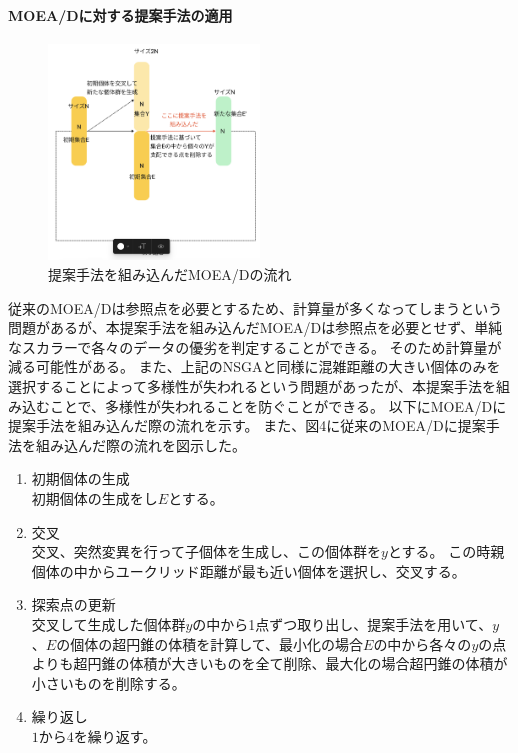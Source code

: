 \documentclass{rentai-chugoku}
\begin{document}
\paragraph{MOEA/Dに対する提案手法の適用}
\begin{figure}[h]
\begin{center}
\includegraphics[width=0.5\textwidth]{MOEAD2.png}
\end{center}
\label{MOEA/D}
\caption{提案手法を組み込んだMOEA/Dの流れ}
\end{figure}
従来のMOEA/Dは参照点を必要とするため、計算量が多くなってしまうという問題があるが、本提案手法を組み込んだMOEA/Dは参照点を必要とせず、単純なスカラーで各々のデータの優劣を判定することができる。
そのため計算量が減る可能性がある。
また、上記のNSGAと同様に混雑距離の大きい個体のみを選択することによって多様性が失われるという問題があったが、本提案手法を組み込むことで、多様性が失われることを防ぐことができる。
以下にMOEA/Dに提案手法を組み込んだ際の流れを示す。
また、図4に従来のMOEA/Dに提案手法を組み込んだ際の流れを図示した。
\begin{enumerate}
\item 初期個体の生成\\
初期個体の生成をし$E$とする。
\item 交叉\\
交叉、突然変異を行って子個体を生成し、この個体群を$y$とする。
この時親個体の中からユークリッド距離が最も近い個体を選択し、交叉する。
\item 探索点の更新\\
交叉して生成した個体群$y$の中から1点ずつ取り出し、提案手法を用いて、$y$、$E$の個体の超円錐の体積を計算して、最小化の場合$E$の中から各々の$y$の点よりも超円錐の体積が大きいものを全て削除、最大化の場合超円錐の体積が小さいものを削除する。
\item 繰り返し\\
$1$から$4$を繰り返す。
\end{enumerate}








 
\end{document}
